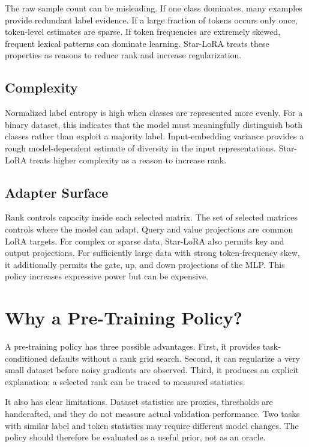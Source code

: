 The raw sample count can be misleading. If one class dominates, many examples provide redundant
label evidence. If a large fraction of tokens occurs only once, token-level estimates are sparse.
If token frequencies are extremely skewed, frequent lexical patterns can dominate learning.
Star-LoRA treats these properties as reasons to reduce rank and increase regularization.

\subsection{Complexity}

Normalized label entropy is high when classes are represented more evenly. For a binary dataset,
this indicates that the model must meaningfully distinguish both classes rather than exploit a
majority label. Input-embedding variance provides a rough model-dependent estimate of diversity in
the input representations. Star-LoRA treats higher complexity as a reason to increase rank.

\subsection{Adapter Surface}

Rank controls capacity inside each selected matrix. The set of selected matrices controls where
the model can adapt. Query and value projections are common LoRA targets. For complex or sparse
data, Star-LoRA also permits key and output projections. For sufficiently large data with strong
token-frequency skew, it additionally permits the gate, up, and down projections of the MLP.
This policy increases expressive power but can be expensive.

\section{Why a Pre-Training Policy?}

A pre-training policy has three possible advantages. First, it provides task-conditioned defaults
without a rank grid search. Second, it can regularize a very small dataset before noisy gradients
are observed. Third, it produces an explicit explanation: a selected rank can be traced to
measured statistics.

It also has clear limitations. Dataset statistics are proxies, thresholds are handcrafted, and
they do not measure actual validation performance. Two tasks with similar label and token
statistics may require different model changes. The policy should therefore be evaluated as a
useful prior, not as an oracle.


